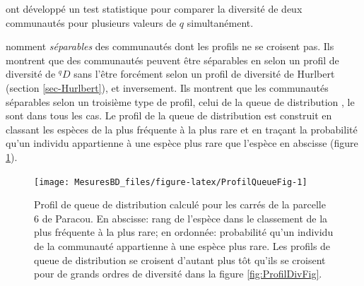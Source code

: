 \documentclass[
  11pt,
  american,
  a4paper,
  extrafontsizes,onecolumn,openright
  ]{memoir}
\newenvironment{Shaded}{\begin{snugshade}}{\end{snugshade}}
\newcommand{\AttributeTok}[1]{\textcolor[rgb]{0.77,0.63,0.00}{#1}}
\newcommand{\CommentTok}[1]{\textcolor[rgb]{0.56,0.35,0.01}{\textit{#1}}}
\newcommand{\DecValTok}[1]{\textcolor[rgb]{0.00,0.00,0.81}{#1}}
\newcommand{\FunctionTok}[1]{\textcolor[rgb]{0.00,0.00,0.00}{#1}}
\newcommand{\NormalTok}[1]{#1}
\newcommand{\SpecialCharTok}[1]{\textcolor[rgb]{0.00,0.00,0.00}{#1}}
\newcommand{\StringTok}[1]{\textcolor[rgb]{0.31,0.60,0.02}{#1}}
\begin{document}
\scriptsize

\begin{Shaded}
\end{Shaded}

\normalsize

\textcite{Pallmann2012} ont développé un test statistique pour comparer la diversité de deux communautés pour plusieurs valeurs de \(q\) simultanément.

\textcite{Liu2006} nomment \emph{séparables} des communautés dont les profils ne se croisent pas.
Ils montrent que des communautés peuvent être séparables en selon un profil de diversité de \(^{q}\!D\) sans l'être forcément selon un profil de diversité de Hurlbert (section \ref{sec-Hurlbert}), et inversement.
Ils montrent que les communautés séparables selon un troisième type de profil, celui de la queue de distribution \autocite{Patil1982}, le sont dans tous les cas.
Le profil de la queue de distribution est construit en classant les espèces de la plus fréquente à la plus rare et en traçant la probabilité qu'un individu appartienne à une espèce plus rare que l'espèce en abscisse (figure \ref{fig:ProfilQueueFig}).



\scriptsize

\begin{figure}

{\centering \texttt{[image: MesuresBD\_files/figure-latex/ProfilQueueFig-1]} 

}

\caption{Profil de queue de distribution calculé pour les carrés de la parcelle 6 de Paracou. En abscisse: rang de l'espèce dans le classement de la plus fréquente à la plus rare; en ordonnée: probabilité qu'un individu de la communauté appartienne à une espèce plus rare. Les profils de queue de distribution se croisent d'autant plus tôt qu'ils se croisent pour de grands ordres de diversité dans la figure \ref{fig:ProfilDivFig}.}\label{fig:ProfilQueueFig}
\end{figure}
\end{document}
